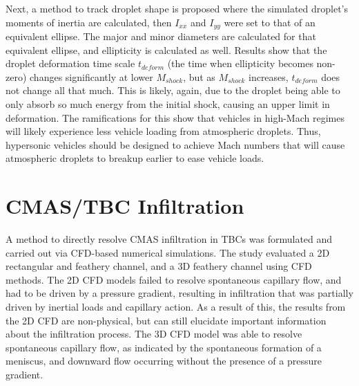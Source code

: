\documentclass{UCF_ETD}
\begin{document}
Next, a method to track droplet shape is proposed where the simulated droplet's moments of inertia are calculated, then $I_{xx}$ and $I_{yy}$ were set to that of an equivalent ellipse. The major and minor diameters are calculated for that equivalent ellipse, and ellipticity is calculated as well. Results show that the droplet deformation time scale $t_{deform}$ (the time when ellipticity becomes non-zero) changes significantly at lower $M_{shock}$, but as $M_{shock}$ increases, $t_{deform}$ does not change all that much. This is likely, again, due to the droplet being able to only absorb so much energy from the initial shock, causing an upper limit in deformation. The ramifications for this show that vehicles in high-Mach regimes will likely experience less vehicle loading from atmospheric droplets. Thus, hypersonic vehicles should be designed to achieve Mach numbers that will cause atmospheric droplets to breakup earlier to ease vehicle loads. 

\section{CMAS/TBC Infiltration}
\label{sec:cmas_conc}
A method to directly resolve CMAS infiltration in TBCs was formulated and carried out via CFD-based numerical simulations. 
The study evaluated a 2D rectangular and feathery channel, and a 3D feathery channel using CFD methods. 
The 2D CFD models failed to resolve spontaneous capillary flow, and had to be driven by a pressure gradient, resulting in infiltration that was partially driven by inertial loads and capillary action.
As a result of this, the results from the 2D CFD are non-physical, but can still elucidate important information about the infiltration process.
The 3D CFD model was able to resolve spontaneous capillary flow, as indicated by the spontaneous formation of a meniscus, and downward flow occurring without the presence of a pressure gradient.
\end{document}
